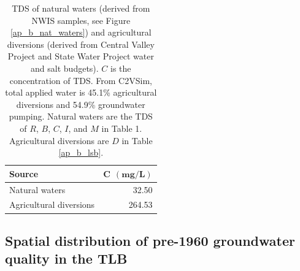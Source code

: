\clearpage




\bgroup

\renewcommand{\arraystretch}{1.5}

\begin{table}[H]
	
	\caption{TDS of natural waters (derived from NWIS samples, see Figure \ref{ap_b_nat_waters}) and agricultural diversions (derived from Central Valley Project and State Water Project water and salt budgets). $C$ is the concentration of TDS. From C2VSim, total applied water is 45.1\% agricultural diversions and 54.9\% groundwater pumping. Natural waters are the TDS of $R$, $B$, $C$, $I$, and $M$ in Table 1. Agricultural diversions are $D$ in Table \ref{ap_b_lsb}.}
	\centering
	
	\begin{tabular}{lr}
		
		\textbf{Source} & $\bm{C \: \: (mg/L)}$ \\ 
		\hline
		Natural waters & 32.50 \\ 
		Agricultural diversions & 264.53 \\ 
		\hline
	\end{tabular}
	
	\label{ap_b_gw_and_sw_c_summary}
\end{table}

\egroup



\subsection{Spatial distribution of pre-1960 groundwater quality in the TLB}


